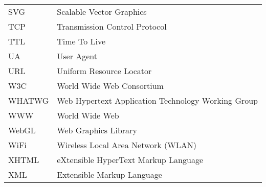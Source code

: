 \begin{longtable}{@{}p{}p{}@{}}
SVG & Scalable Vector Graphics\\
TCP & Transmission Control Protocol\\
TTL & Time To Live\\
UA & User Agent\\
URL & Uniform Resource Locator\\
W3C & World Wide Web Consortium\\
WHATWG & Web Hypertext Application Technology Working Group\\
WWW &  World Wide Web\\
WebGL & Web Graphics Library\\
WiFi & Wireless Local Area Network (WLAN)\\
XHTML & eXtensible HyperText Markup Language\\
XML & Extensible Markup Language\\

\end{longtable}
